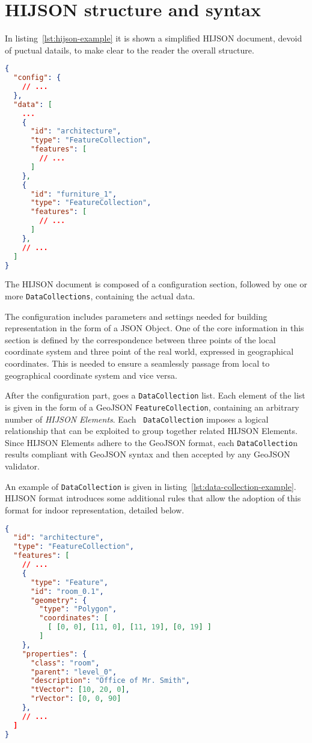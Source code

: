 
\section{HIJSON structure and syntax}\label{hijson-syntax}

In listing~\ref{lst:hijson-example} it is shown a simplified HIJSON document, devoid of puctual datails, to make clear to the reader the overall structure.

\begin{lstlisting}[language=json, label={lst:hijson-example}, captionpos=b, caption=Example of HIJSON document.]
{
  "config": {
    // ...
  },
  "data": [
    ...
    {
      "id": "architecture",
      "type": "FeatureCollection",
      "features": [
        // ...
      ] 
    },
    {
      "id": "furniture_1",
      "type": "FeatureCollection",
      "features": [
        // ...
      ] 
    },
    // ...
  ]
}
\end{lstlisting}


The HIJSON document is composed of a configuration section, followed by one or more {\tt DataCollections}, containing the actual data.

The configuration includes parameters and settings needed for building representation in the form of a JSON Object. One of the core information in this section is defined by the correspondence between three points of the local coordinate system and three point of the real world, expressed in geographical coordinates. This is needed to ensure a seamlessly passage from local to geographical coordinate system and vice versa.

After the configuration part, goes a {\tt DataCollection} list. Each element
of the list is given in the form of a GeoJSON {\tt FeatureCollection},
containing an arbitrary  number of \emph{HIJSON Elements}. Each {\tt
DataCollection} imposes a logical relationship that can be exploited to group
together related HIJSON Elements. Since  HIJSON Elements adhere to the GeoJSON
format, each {\tt DataCollectio}n results compliant with GeoJSON syntax and
then accepted by any GeoJSON validator.

An example of {\tt DataCollection} is given in listing~\ref{lst:data-collection-example}. HIJSON format introduces some additional rules that allow the adoption of this format for indoor representation, detailed below.

\begin{lstlisting}[language=json, label={lst:data-collection-example}, captionpos=b,  caption=Example of {\tt DataCollection}.]
{
  "id": "architecture",
  "type": "FeatureCollection",
  "features": [
    // ...
    {
      "type": "Feature",
      "id": "room_0.1",
      "geometry": {
        "type": "Polygon",
        "coordinates": [ 
          [ [0, 0], [11, 0], [11, 19], [0, 19] ]
        ]
    },
    "properties": {
      "class": "room",
      "parent": "level_0",
      "description": "Office of Mr. Smith",
      "tVector": [10, 20, 0],
      "rVector": [0, 0, 90]
    },
    // ...
  ]
}
\end{lstlisting}

